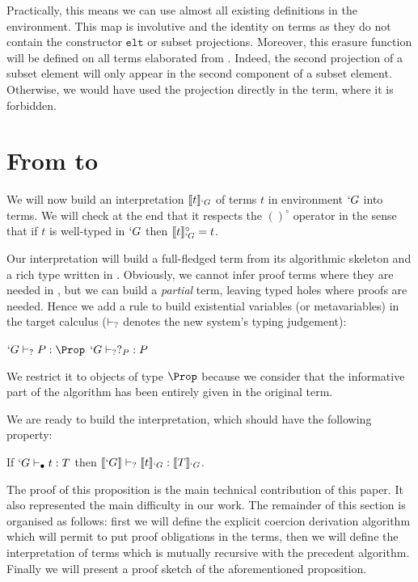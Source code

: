 \documentclass{llncs}
\def\id#1{\texttt{#1}}
\begin{document}
Practically, this means we can use almost all existing definitions in the
\Coq environment. This map is involutive and
the identity on \Russell terms as they do not contain the constructor
$\id{elt}$ or subset projections. Moreover, this erasure function will be
defined on all \Coq terms elaborated from \Russell.
Indeed, the second projection of a
subset element will only appear in the second component of a subset
element. Otherwise, we would have used the projection directly in the
\Russell{} term, where it is forbidden.


\section{From \lng{} to \CICq{}}
\label{sec:Translation}
We will now build an interpretation
$\llbracket t \rrbracket_{`G}$ of \Russell terms $t$ in environment $`G$ into \CIC
terms. We will check at the end that it respects the $()^{\circ}$ operator
in the sense that if $t$ is well-typed in $`G$ then $\llbracket t \rrbracket_{`G}^{\circ} = t$.

Our interpretation will build a full-fledged \CIC term from its
algorithmic skeleton and a rich type written in \Russell. Obviously, we
cannot infer proof terms where they are needed in \CIC, but we can build
a \emph{partial} term, leaving typed holes where proofs are
needed. Hence we add a rule to build existential variables (or
metavariables) in the target calculus ($\vdash_{?}$ denotes the new system's typing judgement):

\begin{center}
  \vspace{-1.7em}
  \UAX{}
  {$`G \typeq P : \Prop$}
  {$`G \vdash_{?} ?_{P} : P$}
  {}
  \DP
  \vspace{-1.7em}
\end{center}
We restrict it to objects of type $\Prop$ because we consider that the
informative part of the algorithm has been entirely given in the
original term. 

We are ready to build the interpretation, which should have the following property:
\begin{proposition}
  If $`G \vdash_{\bullet} t : T$ then $\llbracket `G \rrbracket \vdash_{?} \llbracket t \rrbracket_{`G} : \llbracket T \rrbracket_{`G}$.
\end{proposition}

The proof of this proposition is the main technical contribution of this
paper. It also represented the main difficulty in our work. 
The remainder of this section is organised as follows: first we will
define the explicit coercion derivation algorithm which will permit to
put proof obligations in the terms, then we will define the
interpretation of terms which is mutually recursive with the precedent
algorithm. Finally we will present a proof sketch of the aforementioned
proposition.
\end{document}
